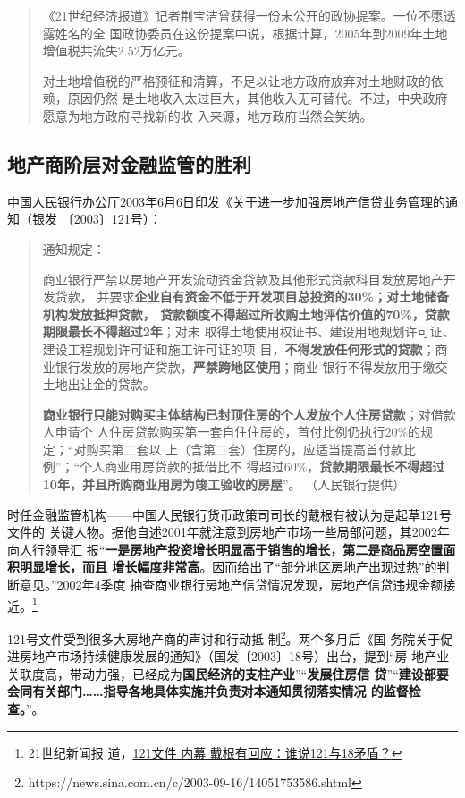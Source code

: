 \begin{quotation}
《21世纪经济报道》记者荆宝洁曾获得一份未公开的政协提案。一位不愿透露姓名的全
国政协委员在这份提案中说，根据计算，2005年到2009年土地增值税共流失2.52万亿元。

对土地增值税的严格预征和清算，不足以让地方政府放弃对土地财政的依赖，原因仍然
是土地收入太过巨大，其他收入无可替代。不过，中央政府愿意为地方政府寻找新的收
入来源，地方政府当然会笑纳。\cite{2011feiteng}
\end{quotation}

\subsection{地产商阶层对金融监管的胜利}

中国人民银行办公厅2003年6月6日印发《关于进一步加强房地产信贷业务管理的通知（银发
〔2003〕121号）：
\begin{quotation}
  通知规定：

  商业银行严禁以房地产开发流动资金贷款及其他形式贷款科目发放房地产开发贷款，
  并要求\textbf{企业自有资金不低于开发项目总投资的30\%；对土地储备机构发放抵押贷款，
    贷款额度不得超过所收购土地评估价值的70\%，贷款期限最长不得超过2年}；对未
  取得土地使用权证书、建设用地规划许可证、建设工程规划许可证和施工许可证的项
  目，\textbf{不得发放任何形式的贷款}；商业银行发放的房地产贷款，\textbf{严禁跨地区使用}；商业
  银行不得发放用于缴交土地出让金的贷款。

  \textbf{商业银行只能对购买主体结构已封顶住房的个人发放个人住房贷款}；对借款人申请个
  人住房贷款购买第一套自住住房的，首付比例仍执行20\%的规定；“对购买第二套以
  上（含第二套）住房的，应适当提高首付款比例”；“个人商业用房贷款的抵借比不
  得超过60\%，\textbf{贷款期限最长不得超过10年，并且所购商业用房为竣工验收的房屋}”。
  （人民银行提供）
\end{quotation}

时任金融监管机构——中国人民银行货币政策司司长的戴根有被认为是起草121号文件的
关键人物。据他自述2001年就注意到房地产市场一些局部问题，其2002年向人行领导汇
报“\textbf{一是房地产投资增长明显高于销售的增长，第二是商品房空置面积明显增长，而且
增长幅度非常高}。因而给出了“部分地区房地产出现过热”的判断意见。”2002年4季度
抽查商业银行房地产信贷情况发现，房地产信贷违规金额接近。\footnote{21世纪新闻报
  道，\href{https://finance.sina.com.cn/x/20031101/1105501003.shtml}{121文件
    内幕 戴根有回应：谁说121与18矛盾？}}

121号文件受到很多大房地产商的声讨和行动抵
制\footnote{https://news.sina.com.cn/c/2003-09-16/14051753586.shtml}。两个多月后《国
务院关于促进房地产市场持续健康发展的通知》（国发〔2003〕18号）出台，提到“房
地产业关联度高，带动力强，已经成为\textbf{国民经济的支柱产业}”“\textbf{发展住房信
  贷}”“\textbf{建设部要会同有关部门……指导各地具体实施并负责对本通知贯彻落实情况
  的监督检查。}”。

